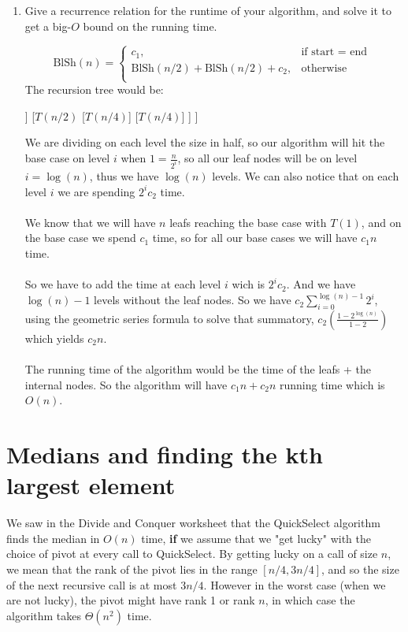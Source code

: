 \documentclass[11pt]{article}
\def\question#1{\red{#1}}
\def\soln#1{\par\blu{#1}} %
\def\blu#1{{\color{blu}#1}}
\def\red#1{{\color{red}#1}}
\begin{document}
\begin{enumerate}
\item \question{Give a recurrence relation for the runtime of your algorithm, and solve it to get a big-$O$ bound on the running time.}
\soln{
  \[
   \mbox{BlSh}(n) = \left \{\begin{array}{ll}
      c_1, & \mbox{if start = end } \\[.3in]
      \text{BlSh}(n/2) + \text{BlSh}(n/2) + c_2, & \mbox{otherwise} \\
      \end{array} \right.
   \]
  The recursion tree would be:
  \begin{center}
    \begin{forest}
      [$T(n)$
        [$T(n/2)$
          [$T(n/4)$]
          [$T(n/4)$]
        ]
        [$T(n/2)$
          [$T(n/4)$]
          [$T(n/4)$]
        ]
      ]
    \end{forest}
  \end{center}
  We are dividing on each level the size in half, so our algorithm will hit the base case on level 
  $i$ when $1 = \frac{n}{2^i}$, so all our leaf nodes will be on level $i = \log(n)$, thus we 
  have $\log(n)$ levels. We can also notice that on each level $i$ we are spending $2^ic_2$ time. \\ \\
  We know that we will have $n$ leafs reaching the base case with $T(1)$, and on the base case we 
  spend $c_1$ time, so for all our base cases we will have $c_1n$ time. \\ \\
  So we have to add the time at each level $i$ wich is $2^ic_2$. And we have $\log(n)-1$ levels without 
  the leaf nodes. So we have $c_2\sum_{i=0}^{\log(n) - 1}2^i$, using the geometric series formula to 
  solve that summatory, $c_2(\frac{1-2^{\log(n)}}{1-2})$ which yields $c_2n$.  \\ \\
  The running time of the algorithm would be the time of the leafs + the internal nodes. So the 
  algorithm will have $c_1n + c_2n$ running time which is $O(n)$.
}
\end{enumerate}
\section{Medians and finding the kth largest element}
\label{sec-2}
We saw in the Divide and Conquer worksheet that the QuickSelect
algorithm finds the median in $O(n)$ time, \textbf{if} we assume that we "get
lucky" with the choice of pivot at every call to QuickSelect. By getting
lucky on a call of size $n$, we mean that the rank of the pivot lies
in the range $[n/4,3n/4]$, and so the size of the next recursive call is at
most $3n/4$.  However in the worst case (when we are not lucky),
the pivot might have rank 1 or rank $n$, in which
case the algorithm takes $\Theta(n^2)$ time.
\end{document}
